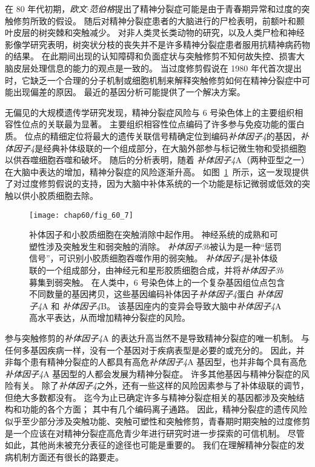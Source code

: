 在 80 年代初期，\textit{欧文$\cdot$范伯格}提出了精神分裂症可能是由于青春期异常和过度的突触修剪所致的假设。
随后对精神分裂症患者的大脑进行的尸检表明，前额叶和颞叶皮层的树突棘和突触减少。
对非人类灵长类动物的研究，以及人类尸检和神经影像学研究表明，树突状分枝的丧失并不是许多精神分裂症患者服用抗精神病药物的结果。
在此期间出现的认知障碍和负面症状与突触修剪不知何故失控、损害大脑皮层处理信息的能力的观点是一致的。
当过度修剪假说在 1980 年代首次提出时，它缺乏一个合理的分子机制或细胞机制来解释突触修剪如何在精神分裂症中可能出现偏差的原因。
最近的基因分析可能提供了一个解决方案。


无偏见的大规模遗传学研究发现，精神分裂症风险与 6 号染色体上的主要组织相容性位点的关联最为显著。
主要组织相容性位点编码了许多参与免疫功能的蛋白质。
位点的精细定位将最大的遗传关联信号精确定位到编码\textit{补体因子4}的基因，\textit{补体因子4}是经典补体级联的一个组成部分，在大脑外部参与标记微生物和受损细胞以供吞噬细胞吞噬和破坏。
随后的分析表明，随着 \textit{补体因子4}A（两种亚型之一）在大脑中表达的增加，精神分裂症的风险逐渐升高。
如图~\ref{fig:60_7}~所示，这一发现提供了对过度修剪假说的支持，因为大脑中补体系统的一个功能是标记微弱或低效的突触以供小胶质细胞去除。


\begin{figure}[htbp]
	\centering
	\texttt{[image: chap60/fig\_60\_7]}
	\caption{补体因子和小胶质细胞在突触消除中起作用。
		神经系统的成熟和可塑性涉及突触发生和弱突触的消除。
		\textit{补体因子3b}被认为是一种“惩罚信号”，可识别小胶质细胞吞噬作用的弱突触。
		\textit{补体因子4}是补体级联的一个组成部分，由神经元和星形胶质细胞合成，并将\textit{补体因子3b}募集到弱突触。
		在人类中，6 号染色体上的一个复杂基因组位点包含不同数量的基因拷贝，这些基因编码补体因子\textit{补体因子4}蛋白 \textit{补体因子4}A 和 \textit{补体因子4}B。
		该基因座内的变异会导致大脑中\textit{补体因子4}A 高水平表达，从而增加精神分裂症的风险。}
	\label{fig:60_7}
\end{figure}


参与突触修剪的\textit{补体因子4}A 的表达升高当然不是导致精神分裂症的唯一机制。
与任何多基因疾病一样，没有一个基因对于疾病表型是必要的或充分的。
因此，并非每个患有精神分裂症的人都具有高危\textit{补体因子4}A 基因型，也并非每个具有高危\textit{补体因子4}A 基因型的人都会发展为精神分裂症。
许多其他基因与精神分裂症的风险有关。
除了\textit{补体因子4}之外，还有一些这样的风险因素参与了补体级联的调节，但绝大多数都没有。
迄今为止已确定许多与精神分裂症相关的基因都涉及突触结构和功能的各个方面；
其中有几个编码离子通路。
因此，精神分裂症的遗传风险似乎至少部分涉及突触功能、突触可塑性和突触修剪，青春期时期突触的过度修剪是一个应该在对精神分裂症高危青少年进行研究时进一步探索的可信机制。
尽管如此，其他尚未被充分表征的途径也可能是重要的。
我们在理解精神分裂症的发病机制方面还有很长的路要走。



